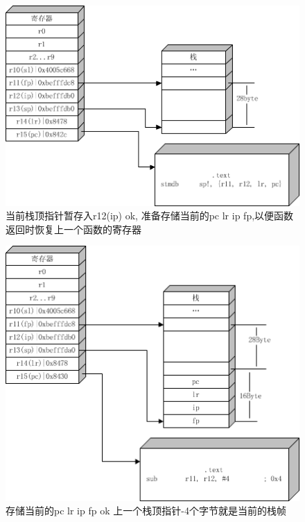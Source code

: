 \begin{figure}[htbp]%
\centering
\includegraphics[bb=0 0 432 294,scale=0.7]{armapcs1_5.png}
\caption{当前栈顶指针暂存入r12(ip) ok, 准备存储当前的pc lr ip fp,以便函数返回时恢复上一个函数的寄存器}
\label{fig:anna}
\end{figure}

\begin{figure}[htbp]%
\centering
\includegraphics[bb=0 0 427 370,scale=0.7]{armapcs1_6.png}
\caption{存储当前的pc lr ip fp ok 上一个栈顶指针-4个字节就是当前的栈帧}
\label{fig:anna}
\end{figure}

